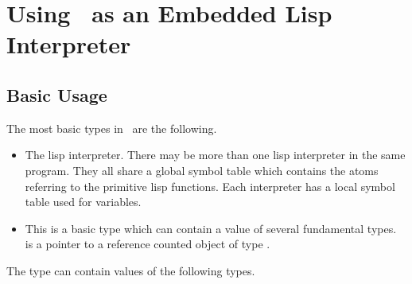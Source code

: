 \section{Using \lips\ as an Embedded Lisp Interpreter}
\subsection{Basic Usage}
The most basic types in \lips\ are the following.
\begin{itemize}
  \item {} The lisp interpreter. There may be more than
    one lisp interpreter in the same program. They all share a global
    symbol table which contains the atoms referring to the primitive
    lisp functions. Each interpreter has a local symbol table used for
    variables.
  \item {} This is a basic type which can contain a value of
    several fundamental types.  is a pointer to a reference
    counted object of type .
\end{itemize}

The  type can contain values of the following types.

